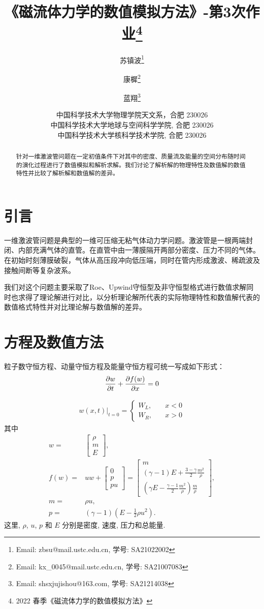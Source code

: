 \documentclass{article}
\title{《磁流体力学的数值模拟方法》-第3次作业\footnote{2022 春季《磁流体力学的数值模拟方法》}}
\author{苏镇波\footnote{Email: zbsu@mail.ustc.edu.cn, 学号: SA21022002}
\and
康樨\footnote{Email: kx\_0045@mail.ustc.edu.cn, 学号: SA21007083}
\and
蓝翔\footnote{Email: shsxjujishou@163.com, 学号: SA21214038}
}
\date{%
\scriptsize%
中国科学技术大学物理学院天文系，合肥 230026\\
中国科学技术大学地球与空间科学学院, 合肥 230026\\
中国科学技术大学核科学技术学院, 合肥 230026
%
}
\begin{document}
\maketitle

\begin{abstract}
针对一维激波管问题在一定初值条件下对其中的密度、质量流及能量的空间分布随时间的演化过程进行了数值模拟和解析求解。我们讨论了解析解的物理特性及数值解的数值特性并比较了解析解和数值解的差异。
\end{abstract}

\section{引言}
一维激波管问题是典型的一维可压缩无粘气体动力学问题。激波管是一根两端封闭、内部充满气体的直管。在直管中由一薄膜隔开两部分密度、压力不同的气体。在初始时刻薄膜破裂，气体从高压段冲向低压端，同时在管内形成激波、稀疏波及接触间断等复杂波系。
\par
我们对这个问题主要采取了Roe、Upwind守恒型及非守恒型格式进行数值求解同时也求得了理论解进行对比，以分析理论解所代表的实际物理特性和数值解代表的数值格式特性并对比理论解与数值解的差异。

\section{方程及数值方法}

粒子数守恒方程、动量守恒方程及能量守恒方程可统一写成如下形式：
\begin{equation} 
{\partial w\over\partial t}+{\partial f(w)\over\partial x}=0 \label{con:Euler}
\end{equation}

\begin{align}
w(x,t)|_{t=0} = \left\{ \begin{array}{ll}
W_L, & \quad x < 0 \\
W_R, & \quad x > 0
\end{array} \right.
\end{align}
其中
\begin{align}
w =& \left[\begin{array}{c}
\rho\\
m\\
E
\end{array}\right],
\\
f(w) =& u w + \left[\begin{array}{c}
0\\
p\\
p u
\end{array}\right] = \left[\begin{array}{c}
m
\\
(\gamma - 1) E + \frac{3 - \gamma}{2} \frac{m^2}{\rho}
\\
(\gamma E - \frac{\gamma - 1}{2} \frac{m^2}{\rho}) \frac{m}{\rho}
\end{array}\right],
\\
m =& \rho u,
\\
p =& (\gamma - 1)(E - \frac{1}{2} \rho u^2).
\end{align}
这里, $\rho$, $u$, $p$ 和 $E$ 分别是密度, 速度, 压力和总能量. 
\par
\end{document}
